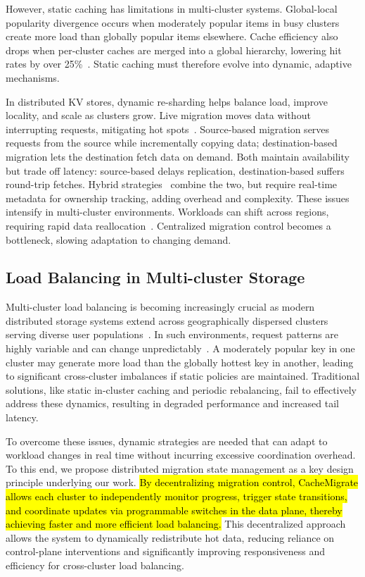 \documentclass[conference]{IEEEtran}
\DeclareRobustCommand{\hlme}[1]{{\sethlcolor{white}\hl{#1}}}
\begin{document}
However, static caching has limitations in multi-cluster systems. Global-local popularity divergence occurs when moderately popular items in busy clusters create more load than globally popular items elsewhere. Cache efficiency also drops when per-cluster caches are merged into a global hierarchy, lowering hit rates by over 25\%~\cite{medeiros2020survey}. Static caching must therefore evolve into dynamic, adaptive mechanisms.

In distributed KV stores, dynamic re-sharding helps balance load, improve locality, and scale as clusters grow. Live migration moves data without interrupting requests, mitigating hot spots~\cite{kulkarni2017rocksteady, katsarakis2021zeus}. Source-based migration serves requests from the source while incrementally copying data; destination-based migration lets the destination fetch data on demand. Both maintain availability but trade off latency: source-based delays replication, destination-based suffers round-trip fetches. Hybrid strategies~\cite{vasilakis2020hybrid2, young2019tictoc} combine the two, but require real-time metadata for ownership tracking, adding overhead and complexity. These issues intensify in multi-cluster environments. Workloads can shift across regions, requiring rapid data reallocation~\cite{decandia2007dynamo}. Centralized migration control becomes a bottleneck, slowing adaptation to changing demand.

\subsection{Load Balancing in Multi-cluster Storage}
Multi-cluster load balancing is becoming increasingly crucial as modern distributed storage systems extend across geographically dispersed clusters serving diverse user populations~\cite{bachar2023optimizing, duraisamy2023towards}. In such environments, request patterns are highly variable and can change unpredictably~\cite{shen2010request}. A moderately popular key in one cluster may generate more load than the globally hottest key in another, leading to significant cross-cluster imbalances if static policies are maintained. Traditional solutions, like static in-cluster caching and periodic rebalancing, fail to effectively address these dynamics, resulting in degraded performance and increased tail latency.

To overcome these issues, dynamic strategies are needed that can adapt to workload changes in real time without incurring excessive coordination overhead. To this end, we propose distributed migration state management as a key design principle underlying our work. \hlme{By decentralizing migration control, CacheMigrate allows each cluster to independently monitor progress, trigger state transitions, and coordinate updates via programmable switches in the data plane, thereby achieving faster and more efficient load balancing.} This decentralized approach allows the system to dynamically redistribute hot data, reducing reliance on control-plane interventions and significantly improving responsiveness and efficiency for cross-cluster load balancing.
\end{document}
